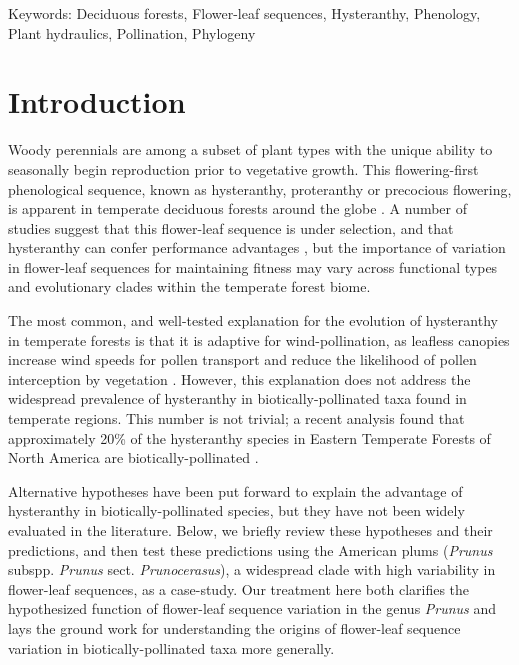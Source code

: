 \documentclass{article}[12pt]
\begin{document}
Keywords: Deciduous forests, Flower-leaf sequences, Hysteranthy, Phenology, Plant hydraulics, Pollination, Phylogeny

\pagebreak
\section*{Introduction}
\noindent Woody perennials are among a subset of plant types with the unique ability to seasonally begin reproduction prior to vegetative growth. This flowering-first phenological sequence, known as hysteranthy, proteranthy or precocious flowering, is apparent in temperate deciduous forests around the globe \citep{Rathcke_1985}. A number of studies suggest that this flower-leaf sequence is under selection, and that hysteranthy can confer performance advantages \citep{Gougherty2018,Buonaiuto2020,Guo2014}, but the importance of variation in flower-leaf sequences for maintaining fitness may vary across functional types and evolutionary clades within the temperate forest biome. %

\noindent The most common, and well-tested explanation for the evolution of hysteranthy in temperate forests is that it is adaptive for wind-pollination, as leafless canopies increase wind speeds for pollen transport and reduce the likelihood of pollen interception by vegetation \citep{Whitehead1969,Niklas1985}. However, this explanation does not address the widespread prevalence of hysteranthy in biotically-pollinated taxa found in temperate regions. This number is not trivial; a recent analysis found that approximately 20\% of the hysteranthy species in Eastern Temperate Forests of North America are biotically-pollinated \citep{Buonaiuto2020}. 

Alternative hypotheses have been put forward to explain the advantage of hysteranthy in biotically-pollinated species, but they have not been widely evaluated in the literature. Below, we briefly review these hypotheses and their predictions, and then test these predictions using the American plums (\textit{Prunus} subspp. \textit{Prunus} sect. \textit{Prunocerasus}), a widespread clade with high variability in flower-leaf sequences, as a case-study. Our treatment here both clarifies the hypothesized function of flower-leaf sequence variation in the genus \emph{Prunus} and lays the ground work for understanding the origins of flower-leaf sequence variation in biotically-pollinated taxa more generally.%
\end{document}
